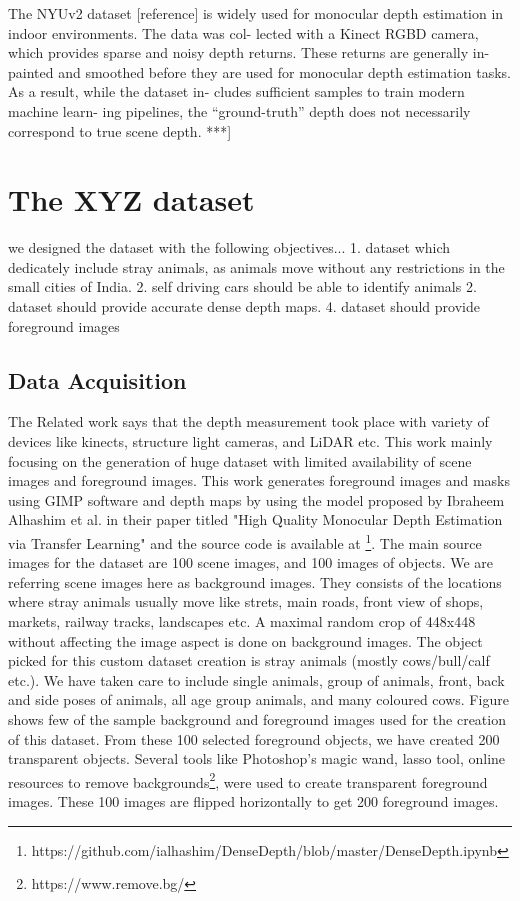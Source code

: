 \documentclass{article}
\begin{document}
The NYUv2 dataset [reference] is widely used for monocular depth estimation in indoor environments. The data was col- lected with a Kinect RGBD camera, which provides sparse and noisy depth returns. These returns are generally in- painted and smoothed before they are used for monocular depth estimation tasks. As a result, while the dataset in- cludes sufficient samples to train modern machine learn- ing pipelines, the “ground-truth” depth does not necessarily correspond to true scene depth.
***]

\section{The XYZ dataset}
we designed the dataset with the following objectives...
1. dataset which dedicately include stray animals, as animals move without any restrictions in the small cities of India.
2. self driving cars should be able to identify animals
2. dataset should provide accurate dense depth maps.
4. dataset should provide foreground images

\subsection{Data Acquisition}
The Related work says that the depth measurement took place with variety of devices like kinects, structure light cameras, and LiDAR etc. This work mainly focusing on the generation of huge dataset with limited availability of scene images and foreground images. This work generates foreground images and masks using GIMP \cite{howat2014greenland} software and depth maps by using the model proposed by Ibraheem Alhashim et al. in their paper titled "High Quality Monocular Depth Estimation via Transfer Learning" \cite{alhashim2018high} and the source code is available at \footnote{https://github.com/ialhashim/DenseDepth/blob/master/DenseDepth.ipynb}. The main source images for the dataset are 100 scene images, and 100 images of objects. We are referring scene images here as background images. They consists of the locations where stray animals usually move like strets, main roads, front view of shops, markets, railway tracks, landscapes etc. A maximal random crop of 448x448 without affecting the image aspect is done on background images. The object picked for this custom dataset creation is stray animals (mostly cows/bull/calf etc.). We have taken care to include single animals, group of animals, front, back and side poses of animals, all age group animals, and many coloured cows. Figure shows few of the sample background and foreground images used for the creation of this dataset. From these 100 selected foreground objects, we have created 200 transparent objects. Several tools like Photoshop's magic wand, lasso tool, online resources to remove backgrounds\footnote{https://www.remove.bg/}, were used to create transparent foreground images. These 100 images are flipped horizontally to get 200 foreground images.
\end{document}
